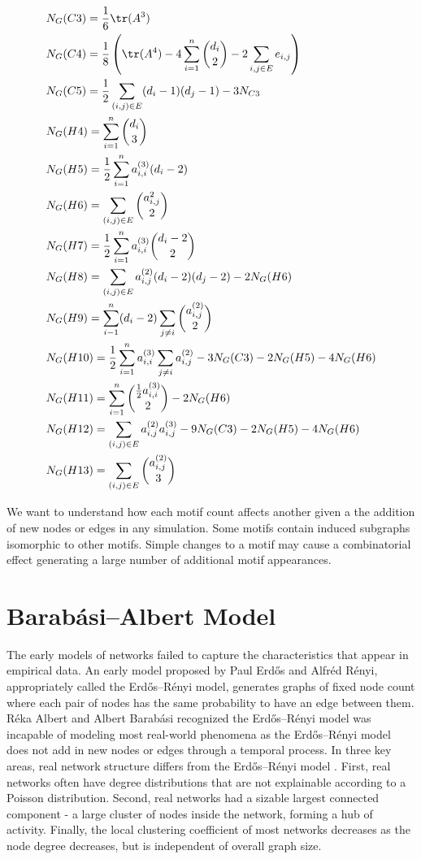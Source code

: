 \begin{align*}
    &N_G(C3) = \frac{1}{6} \tr({A^3}) \\
    &N_G(C4) = \frac{1}{8} \left(\tr(A^4) -4\sum^{n}_{i=1} {d_i \choose 2} - 2\sum_{i,j \in E} e_{i,j} \right)\\
    &N_G(C5) = \frac{1}{2}\sum_{(i,j)\in E} (d_i - 1)(d_j - 1) - 3 N_{C3} \\
    &N_G(H4) = \sum^{n}_{i=1} {d_i \choose 3} \\
    &N_G(H5) = \frac{1}{2} \sum^{n}_{i=1} a^{(3)}_{i,i} (d_i-2)\\
    &N_G(H6)= \sum_{(i,j)\in E}{a^{2}_{i,j} \choose 2 }\\
    &N_G(H7) = \frac{1}{2} \sum^{n}_{i=1} a^{(3)}_{i,i} {{d_i-2} \choose 2}\\
    &N_G(H8)= \sum_{(i,j)\in E} a^{(2)}_{i,j} (d_i-2)(d_j-2) - 2 N_G(H6)\\
    &N_G(H9) = \sum^{n}_{i-1}(d_i-2) \sum_{j \neq i} {a^{(2)}_{i,j} \choose 2 }\\
    &N_G(H10) = \frac{1}{2}\sum^{n}_{i=1}a^{(3)}_{i,i} \sum_{j \neq i} a^{(2)}_{i,j} - 3 N_G(C3)- 2N_G(H5) -4N_G(H6)\\
    &N_G(H11) = \sum^{n}_{i=1} {\frac{1}{2}a^{(3)}_{i,i} \choose 2} - 2N_G(H6)\\
    &N_G(H12) = \sum_{(i,j)\in E} a^{(2)}_{i,j} a^{(3)}_{i,j} - 9N_G(C3) -2N_G(H5)-4N_G(H6)\\
    &N_G(H13) = \sum_{(i,j)\in E} {a^{(2)}_{i,j} \choose 3}\\
\end{align*}

We want to understand how each motif count affects another given a the addition of new nodes or edges
in any simulation. Some motifs contain induced subgraphs isomorphic to other motifs. Simple changes
to a motif may cause a combinatorial effect generating a large number of additional motif appearances.

\chapter{Barabási–Albert Model}
\label{section:BA model}
The early models of networks failed to capture the characteristics that appear in empirical data. An
 early model proposed by Paul Erdős and Alfréd Rényi, appropriately called the Erdős–Rényi model, generates
graphs of fixed node count where each pair of nodes has the same probability to have an edge between them. 
Réka Albert and Albert Barabási recognized the Erdős–Rényi model 
was incapable of modeling most real-world phenomena as the Erdős–Rényi model does not add
in new nodes or edges through a temporal process. 
In three key areas, real network structure differs from
the Erdős–Rényi model \cite{barabasi2016network}.
 First, real networks often have degree distributions 
that are not explainable according to a Poisson distribution.
Second, real networks had a sizable largest connected component - a large cluster 
of nodes inside the network, forming a hub of activity.
 Finally, the local clustering coefficient of most networks
decreases as the node degree decreases, but is independent of overall graph size.

